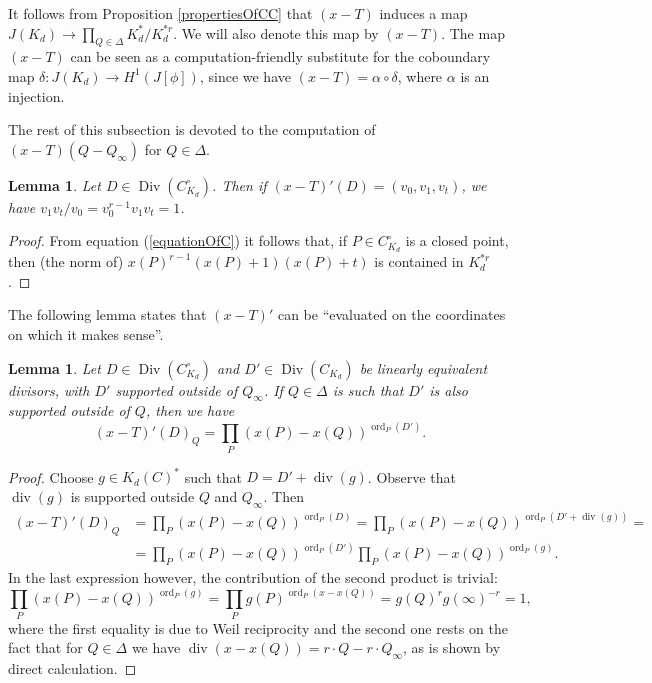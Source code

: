 \documentclass[reqno]{amsart}
\newtheorem{lemma}[thm]{Lemma}
\theoremstyle{definition}
\theoremstyle{remark}
\newcommand{\Div}{\operatorname{Div}}
\newcommand{\divi}{\operatorname{div}}
\newcommand{\XminusT}{(x-T)}
\newcommand{\xminusT}{(x-T)'}
\begin{document}
It follows from Proposition \ref{propertiesOfCC} that $\XminusT$ induces a map $J(K_d) \rightarrow \prod_{Q \in \Delta} K_d^{\ast}/K_d^{\ast r}$. We will also denote this map by $\XminusT$. The map $\XminusT$ can be seen as a computation-friendly substitute for the coboundary map $\delta : J(K_d) \rightarrow H^1(J[\phi])$, since we have $\XminusT = \alpha \circ \delta$, where $\alpha$ is an injection.

The rest of this subsection is devoted to the computation of $\XminusT(Q-Q_{\infty})$ for $Q \in \Delta$.

\begin{lemma}
\label{norm}
Let $D \in \Div(C_{K_d}^\circ)$. Then if $\xminusT(D)=(v_0,v_1,v_t)$, we have $v_1v_t/v_0 = v_0^{r-1}v_1v_t = 1$.
\end{lemma}
\begin{proof}
From equation (\ref{equationOfC}) it follows that, if $P \in C_{K_d}^\circ$ is a closed point, then (the norm of) $x(P)^{r-1}(x(P)+1)(x(P)+t)$ is contained in $K_d^{\ast r}$.
\end{proof}

The following lemma states that $\xminusT$ can be ``evaluated on the coordinates on which it makes sense''.

\begin{lemma}
\label{evaluateWhereItMakesSense}
Let $D \in \Div(C_{K_d}^\circ)$ and $D' \in \Div(C_{K_d})$ be linearly equivalent divisors, with $D'$ supported outside of $Q_\infty$. If $Q \in \Delta$ is such that $D'$ is also supported outside of $Q$, then we have
$$
\xminusT(D)_Q = \prod_P (x(P)-x(Q))^{\operatorname{ord}_P(D')}.
$$
\end{lemma}
\begin{proof}
Choose $g \in K_d(C)^{\ast}$ such that $D = D'+\divi(g)$. Observe that $\divi(g)$ is supported outside $Q$ and $Q_\infty$. Then
\begin{align*}
\xminusT(D)_Q & = \prod_P (x(P)-x(Q))^{\operatorname{ord}_P(D)}=\prod_P (x(P)-x(Q))^{\operatorname{ord}_P(D'+\divi(g))} = \\\
 & = \prod_P (x(P)-x(Q))^{\operatorname{ord}_P(D')} \prod_P (x(P)-x(Q))^{\operatorname{ord}_P(g)}.
\end{align*}
In the last expression however, the contribution of the second product is trivial:
$$
\prod_P (x(P)-x(Q))^{\operatorname{ord}_P(g)} = \prod_{P} g(P)^{\operatorname{ord}_P(x-x(Q))} = g(Q)^r g(\infty)^{-r} = 1,
$$
where the first equality is due to Weil reciprocity and the second one rests on the fact that for $Q \in \Delta$ we have $\divi(x-x(Q)) = r \cdot Q - r \cdot Q_\infty$, as is shown by direct calculation.
\end{proof}
\end{document}
